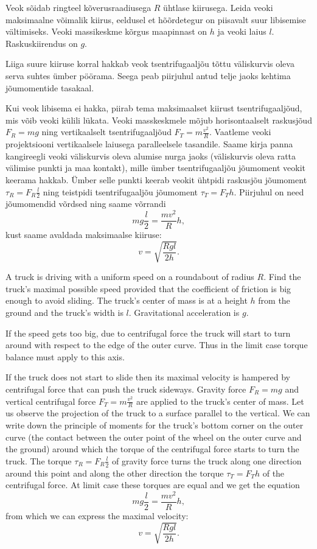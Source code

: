 
Veok sõidab ringteel kõverusraadiusega $R$ ühtlase kiirusega. Leida veoki maksimaalne võimalik kiirus, eeldusel et hõõrdetegur on piisavalt suur libisemise vältimiseks. Veoki massikeskme kõrgus maapinnast on $h$ ja veoki laius $l$. Raskuskiirendus on $g$.

\hint
Liiga suure kiiruse korral hakkab veok tsentrifugaaljõu tõttu väliskurvis oleva serva suhtes ümber pöörama. Seega peab piirjuhul antud telje jaoks kehtima jõumomentide tasakaal.

\solu
Kui veok libisema ei hakka, piirab tema maksimaalset kiirust tsentrifugaaljõud, mis võib veoki külili lükata. Veoki masskeskmele mõjub horisontaalselt raskusjõud $F_R=mg$ ning vertikaalselt tsentrifugaaljõud $F_T=m\frac{v^2}{R}$. 
Vaatleme veoki projektsiooni vertikaalsele laiusega paralleelsele tasandile. Saame kirja panna kangireegli veoki väliskurvis oleva alumise nurga jaoks (väliskurvis oleva ratta välimise punkti ja maa kontakt), mille ümber tsentrifugaaljõu jõumoment veokit keerama hakkab. Ümber selle punkti keerab veokit ühtpidi raskusjõu jõumoment $\tau_R=F_R\frac{l}{2}$ ning teistpidi tsentrifugaaljõu jõumoment $\tau_T=F_T h$. Piirjuhul on need jõumomendid võrdsed ning saame võrrandi
$$mg\frac{l}{2}=\frac{mv^2}{R}h,$$ 
kust saame avaldada maksimaalse kiiruse:
$$v=\sqrt{\frac{Rgl}{2h}}.$$ 

A truck is driving with a uniform speed on a roundabout of radius $R$. Find the truck’s maximal possible speed provided that the coefficient of friction is big enough to avoid sliding. The truck’s center of mass is at a height $h$ from the ground and the truck’s width is $l$. Gravitational acceleration is $g$.

\hinteng
If the speed gets too big, due to centrifugal force the truck will start to turn around with respect to the edge of the outer curve. Thus in the limit case torque balance must apply to this axis.

\solueng
If the truck does not start to slide then its maximal velocity is hampered by centrifugal force that can push the truck sideways. Gravity force $F_R=mg$ and vertical centrifugal force $F_T=m\frac{v^2}{R}$ are applied to the truck’s center of mass. Let us observe the projection of the truck to a surface parallel to the vertical. We can write down the principle of moments for the truck’s bottom corner on the outer curve (the contact between the outer point of the wheel on the outer curve and the ground) around which the torque of the centrifugal force starts to turn the truck. The torque $\tau_R=F_R\frac{l}{2}$ of gravity force turns the truck along one direction around this point and along the other direction the torque $\tau_T=F_T h$ of the centrifugal force. At limit case these torques are equal and we get the equation
$$mg\frac{l}{2}=\frac{mv^2}{R}h,$$ 
from which we can express the maximal velocity:
$$v=\sqrt{\frac{Rgl}{2h}}.$$
\probend